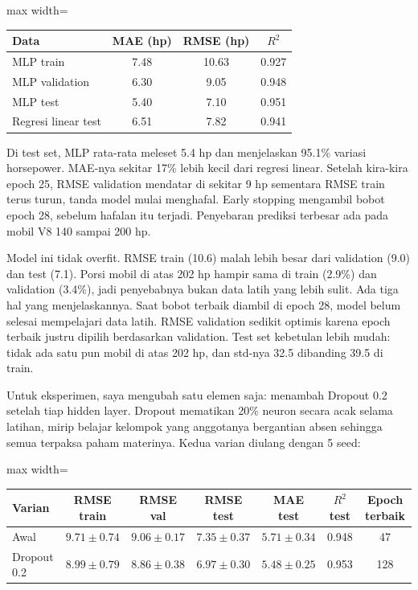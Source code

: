 \begin{adjustbox}{max width=\textwidth}\begin{tabular}{@{}lccc@{}}
\toprule
\textbf{Data} & \textbf{MAE (hp)} & \textbf{RMSE (hp)} & \textbf{$R^2$} \\
\midrule
MLP train & 7.48 & 10.63 & 0.927 \\
MLP validation & 6.30 & 9.05 & 0.948 \\
MLP test & 5.40 & 7.10 & 0.951 \\
Regresi linear test & 6.51 & 7.82 & 0.941 \\
\bottomrule
\end{tabular}\end{adjustbox}


Di test set, MLP rata-rata meleset 5.4 hp dan menjelaskan 95.1\% variasi horsepower. MAE-nya sekitar 17\% lebih kecil dari regresi linear. Setelah kira-kira epoch 25, RMSE validation mendatar di sekitar 9 hp sementara RMSE train terus turun, tanda model mulai menghafal. Early stopping mengambil bobot epoch 28, sebelum hafalan itu terjadi. Penyebaran prediksi terbesar ada pada mobil V8 140 sampai 200 hp.

Model ini tidak overfit. RMSE train (10.6) malah lebih besar dari validation (9.0) dan test (7.1). Porsi mobil di atas 202 hp hampir sama di train (2.9\%) dan validation (3.4\%), jadi penyebabnya bukan data latih yang lebih sulit. Ada tiga hal yang menjelaskannya. Saat bobot terbaik diambil di epoch 28, model belum selesai mempelajari data latih. RMSE validation sedikit optimis karena epoch terbaik justru dipilih berdasarkan validation. Test set kebetulan lebih mudah: tidak ada satu pun mobil di atas 202 hp, dan std-nya 32.5 dibanding 39.5 di train.

Untuk eksperimen, saya mengubah satu elemen saja: menambah Dropout 0.2 setelah tiap hidden layer. Dropout mematikan 20\% neuron secara acak selama latihan, mirip belajar kelompok yang anggotanya bergantian absen sehingga semua terpaksa paham materinya. Kedua varian diulang dengan 5 seed:

\begin{adjustbox}{max width=\textwidth}\begin{tabular}{@{}lcccccc@{}}
\toprule
\textbf{Varian} & \textbf{RMSE train} & \textbf{RMSE val} & \textbf{RMSE test} & \textbf{MAE test} & \textbf{$R^2$ test} & \textbf{Epoch terbaik} \\
\midrule
Awal & $9.71 \pm 0.74$ & $9.06 \pm 0.17$ & $7.35 \pm 0.37$ & $5.71 \pm 0.34$ & 0.948 & 47 \\
Dropout 0.2 & $8.99 \pm 0.79$ & $8.86 \pm 0.38$ & $6.97 \pm 0.30$ & $5.48 \pm 0.25$ & 0.953 & 128 \\
\bottomrule
\end{tabular}\end{adjustbox}

